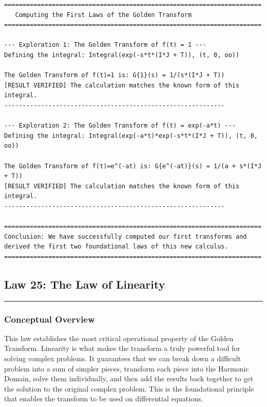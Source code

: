 \begin{verbatim}
======================================================================
   Computing the First Laws of the Golden Transform
======================================================================

--- Exploration 1: The Golden Transform of f(t) = 1 ---
Defining the integral: Integral(exp(-s*t*(I*J + T)), (t, 0, oo))

The Golden Transform of f(t)=1 is: G{1}(s) = 1/(s*(I*J + T))
[RESULT VERIFIED] The calculation matches the known form of this integral.
------------------------------------------------------------

--- Exploration 2: The Golden Transform of f(t) = exp(-a*t) ---
Defining the integral: Integral(exp(-a*t)*exp(-s*t*(I*J + T)), (t, 0, oo))

The Golden Transform of f(t)=e^(-at) is: G{e^(-at)}(s) = 1/(a + s*(I*J + T))
[RESULT VERIFIED] The calculation matches the known form of this integral.
------------------------------------------------------------

======================================================================
Conclusion: We have successfully computed our first transforms and
derived the first two foundational laws of this new calculus.
======================================================================
\end{verbatim}

\subsection*{Law 25: The Law of Linearity}
\hrule
\vspace{0.3cm}
\vspace{0.5cm}

\subsubsection*{Conceptual Overview}
This law establishes the most critical operational property of the Golden Transform. Linearity is what makes the transform a truly powerful tool for solving complex problems. It guarantees that we can break down a difficult problem into a sum of simpler pieces, transform each piece into the Harmonic Domain, solve them individually, and then add the results back together to get the solution to the original complex problem. This is the foundational principle that enables the transform to be used on differential equations.

